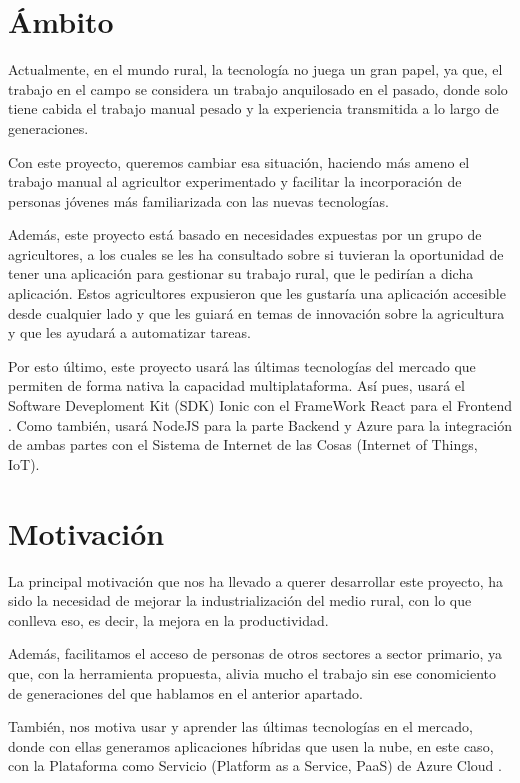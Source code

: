 \section{Ámbito}
Actualmente, en el mundo rural, la tecnología no juega un gran papel, ya que, el trabajo en el campo se considera un trabajo anquilosado en el pasado, donde solo tiene cabida el trabajo manual pesado y la experiencia transmitida a lo largo de generaciones.

Con este proyecto, queremos cambiar esa situación, haciendo más ameno el trabajo manual al agricultor experimentado y facilitar la incorporación de personas jóvenes más familiarizada con las nuevas tecnologías.

Además, este proyecto está basado en necesidades expuestas por un grupo de agricultores, a los cuales se les ha consultado sobre si tuvieran la oportunidad de tener una aplicación para gestionar su trabajo rural, que le pedirían a dicha aplicación. Estos agricultores expusieron que les gustaría una aplicación accesible desde cualquier lado y que les guiará en temas de innovación sobre la agricultura y que les ayudará a automatizar tareas.

Por esto último, este proyecto usará las últimas tecnologías del mercado que permiten de forma nativa la capacidad multiplataforma. Así pues, usará el Software Deveploment Kit (SDK) Ionic \cite{ionic} con el FrameWork React \cite{react} para el Frontend \cite{frontend}. Como también, usará NodeJS \cite{nodejs} para la parte Backend \cite{backend} y Azure \cite{azure} para la integración de ambas partes con el Sistema de Internet de las Cosas (Internet of Things, IoT).

\section{Motivación}
La principal motivación que nos ha llevado a querer desarrollar este proyecto, ha sido la necesidad de mejorar la industrialización del medio rural, con lo que conlleva eso, es decir, la mejora en la productividad.

Además, facilitamos el acceso de personas de otros sectores a sector primario, ya que, con la herramienta propuesta, alivia mucho el trabajo sin ese conomiciento de generaciones del que hablamos en el anterior apartado.

También, nos motiva usar y aprender las últimas tecnologías en el mercado, donde con ellas generamos aplicaciones híbridas que usen la nube, en este caso, con la Plataforma como Servicio (Platform as a Service, PaaS) de Azure Cloud \cite{azure}.

